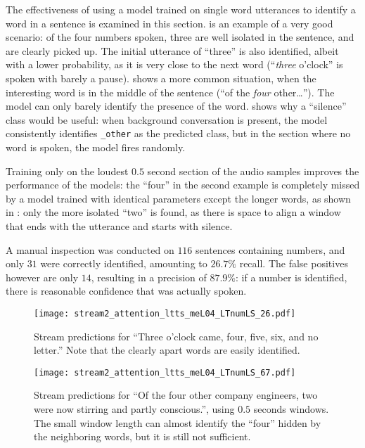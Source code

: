 The effectiveness of using a model trained on single word utterances to
identify a word in a sentence is examined in this section.
%
 is an example of a very good
scenario: of the four numbers spoken, three are well isolated in the sentence,
and are clearly picked up. The initial utterance of ``three'' is also
identified, albeit with a lower probability, as it is very close to the next
word (``\textit{three} o'clock'' is spoken with barely a pause).
%
 shows a more common situation,
when the interesting word is in the middle of the sentence (``of the
\textit{four} other\ldots''). The model can only barely identify the presence
of the word.
%
 shows why a ``silence'' class
would be useful: when background conversation is present, the model
consistently identifies \texttt{\_other} as the predicted class, but in the
section where no word is spoken, the model fires randomly.

Training only on the loudest $0.5$ second section of the audio samples improves
the performance of the models: the ``four'' in the second example is completely
missed by a model trained with identical parameters except the longer words, as
shown in : only the more isolated
``two'' is found, as there is space to align a window that ends with the
utterance and starts with silence.

A manual inspection was conducted on $116$ sentences containing numbers, and
only $31$ were correctly identified, amounting to $26.7\%$ recall.
The false positives however are only $14$, resulting in a precision of
$87.9\%$: if a number is identified, there is reasonable confidence that was
actually spoken.

\begin{figure}[h!]
    \centering
    \texttt{[image: stream2\_attention\_ltts\_meL04\_LTnumLS\_26.pdf]}
    \caption{Stream predictions for ``Three o'clock came, four, five, six, and no letter.''
        Note that the clearly apart words are easily identified.
    }%
    \label{fig:stream_attention_ltts_meL04_LTnumLS_26}
\end{figure}

\begin{figure}[h!]
    \centering
    \texttt{[image: stream2\_attention\_ltts\_meL04\_LTnumLS\_67.pdf]}
    \caption{Stream predictions for
        ``Of the four other company engineers, two were now stirring and partly
        conscious.'', using $0.5$ seconds windows. The small window length
        can almost identify the ``four'' hidden by the neighboring
        words, but it is still not sufficient.
    }%
    \label{fig:stream_attention_ltts_meL04_LTnumLS_67}
\end{figure}

